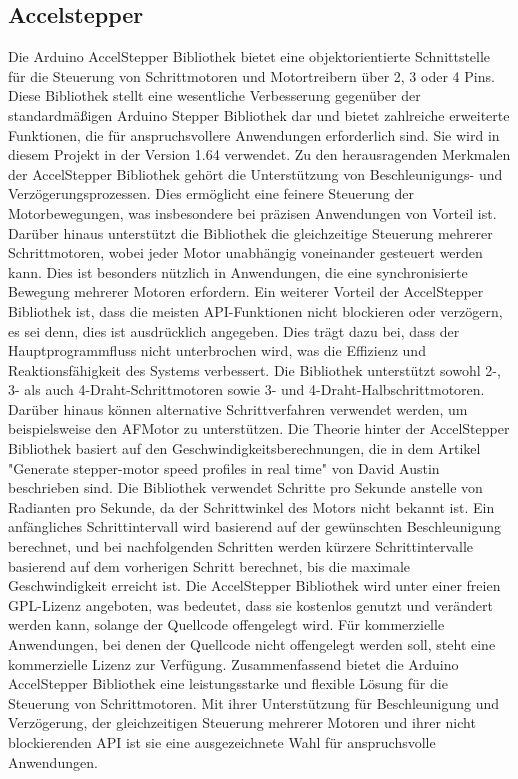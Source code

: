 \subsection{Accelstepper}
Die Arduino AccelStepper Bibliothek bietet eine objektorientierte Schnittstelle für die Steuerung von Schrittmotoren und Motortreibern über 2, 3 oder 4 Pins. Diese Bibliothek stellt eine wesentliche Verbesserung gegenüber der standardmäßigen Arduino Stepper Bibliothek dar und bietet zahlreiche erweiterte Funktionen, die für anspruchsvollere Anwendungen erforderlich sind. Sie wird in diesem Projekt in der Version 1.64 verwendet.
Zu den herausragenden Merkmalen der AccelStepper Bibliothek gehört die Unterstützung von Beschleunigungs- und Verzögerungsprozessen. Dies ermöglicht eine feinere Steuerung der Motorbewegungen, was insbesondere bei präzisen Anwendungen von Vorteil ist. Darüber hinaus unterstützt die Bibliothek die gleichzeitige Steuerung mehrerer Schrittmotoren, wobei jeder Motor unabhängig voneinander gesteuert werden kann. Dies ist besonders nützlich in Anwendungen, die eine synchronisierte Bewegung mehrerer Motoren erfordern.
Ein weiterer Vorteil der AccelStepper Bibliothek ist, dass die meisten API-Funktionen nicht blockieren oder verzögern, es sei denn, dies ist ausdrücklich angegeben. Dies trägt dazu bei, dass der Hauptprogrammfluss nicht unterbrochen wird, was die Effizienz und Reaktionsfähigkeit des Systems verbessert. Die Bibliothek unterstützt sowohl 2-, 3- als auch 4-Draht-Schrittmotoren sowie 3- und 4-Draht-Halbschrittmotoren. Darüber hinaus können alternative Schrittverfahren verwendet werden, um beispielsweise den AFMotor zu unterstützen.
Die Theorie hinter der AccelStepper Bibliothek basiert auf den Geschwindigkeitsberechnungen, die in dem Artikel "Generate stepper-motor speed profiles in real time" von David Austin beschrieben sind. Die Bibliothek verwendet Schritte pro Sekunde anstelle von Radianten pro Sekunde, da der Schrittwinkel des Motors nicht bekannt ist. Ein anfängliches Schrittintervall wird basierend auf der gewünschten Beschleunigung berechnet, und bei nachfolgenden Schritten werden kürzere Schrittintervalle basierend auf dem vorherigen Schritt berechnet, bis die maximale Geschwindigkeit erreicht ist.
Die AccelStepper Bibliothek wird unter einer freien GPL-Lizenz angeboten, was bedeutet, dass sie kostenlos genutzt und verändert werden kann, solange der Quellcode offengelegt wird. Für kommerzielle Anwendungen, bei denen der Quellcode nicht offengelegt werden soll, steht eine kommerzielle Lizenz zur Verfügung.
Zusammenfassend bietet die Arduino AccelStepper Bibliothek eine leistungsstarke und flexible Lösung für die Steuerung von Schrittmotoren. Mit ihrer Unterstützung für Beschleunigung und Verzögerung, der gleichzeitigen Steuerung mehrerer Motoren und ihrer nicht blockierenden API ist sie eine ausgezeichnete Wahl für anspruchsvolle Anwendungen.\cite{MikeMcCauley.2024}

